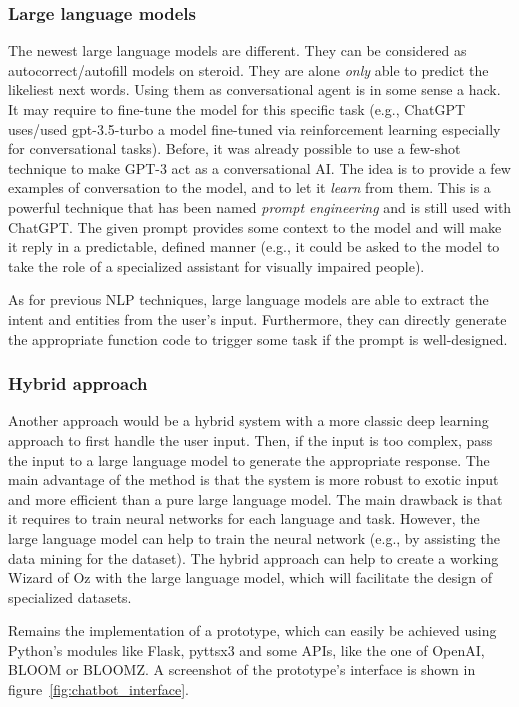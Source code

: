 \documentclass[sigconf]{acmart}
\begin{document}
\subsubsection{Large language models}
The newest large language models are different. They can be considered as autocorrect/autofill models on steroid. They are alone \textit{only} able to predict the likeliest next words. Using them as conversational agent is in some sense a hack. It may require to fine-tune the model for this specific task (e.g., ChatGPT uses/used gpt-3.5-turbo a model fine-tuned via reinforcement learning especially for conversational tasks\cite{ouyangTrainingLanguageModels2022}). Before, it was already possible to use a few-shot technique to make GPT-3 act as a conversational AI. The idea is to provide a few examples of conversation to the model, and to let it \textit{learn} from them. This is a powerful technique that has been named \textit{prompt engineering} and is still used with ChatGPT. The given prompt provides some context to the model and will make it reply in a predictable, defined manner (e.g., it could be asked to the model to take the role of a specialized assistant for visually impaired people).

As for previous NLP techniques, large language models are able to extract the intent and entities from the user's input\cite{dunnStructuredInformationExtraction2022}. Furthermore, they can directly generate the appropriate function code to trigger some task if the prompt is well-designed.

\subsubsection{Hybrid approach}
Another approach would be a hybrid system with a more classic deep learning approach to first handle the user input. Then, if the input is too complex, pass the input to a large language model to generate the appropriate response. The main advantage of the method is that the system is more robust to exotic input and more efficient than a pure large language model. The main drawback is that it requires to train neural networks for each language and task. However, the large language model can help to train the neural network (e.g., by assisting the data mining for the dataset). The hybrid approach can help to create a working Wizard of Oz\cite{lugrinHandbookSociallyInteractive2021} with the large language model, which will facilitate the design of specialized datasets.

Remains the implementation of a prototype, which can easily be achieved using Python's modules like Flask, pyttsx3 and some APIs, like the one of OpenAI, BLOOM\cite{workshopBLOOM176BParameterOpenAccess2023} or BLOOMZ. A screenshot of the prototype's interface is shown in figure~\ref{fig:chatbot_interface}.
\end{document}
